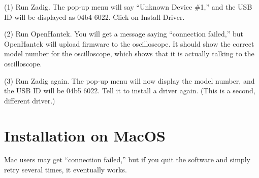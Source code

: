 (1) Run Zadig. The pop-up menu will say ``Unknown Device \#1,'' and
the USB ID will be displayed as 04b4 6022. Click on Install Driver.

(2) Run OpenHantek. You will get a message saying ``connection failed,'' but OpenHantek
will upload firmware to the oscilloscope. It should show the correct model number for
the oscilloscope, which shows that it is actually talking to the oscilloscope.

(3) Run Zadig again. The pop-up menu will now display the model number, and
the USB ID will be 04b5 6022. Tell it to install a driver again. (This is a
second, different driver.)


\section*{Installation on MacOS}

Mac users may get ``connection failed,'' but if you quit
the software and simply retry several times, it eventually works.

